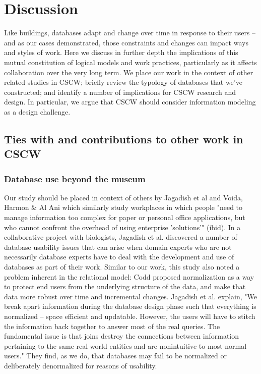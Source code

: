 \section{Discussion}

Like buildings, databases adapt and change over time in response to their users -- and as our cases demonstrated, those constraints and changes can impact ways and styles of work. Here we discuss in further depth the implications of this mutual constitution of logical models and work practices, particularly as it affects collaboration over the very long term. We place our work in the context of other related studies in CSCW; briefly review the typology of databases that we've constructed; and identify a number of implications for CSCW research and design. In particular, we argue that CSCW should consider information modeling as a design challenge.

\subsection {Ties with and contributions to other work in CSCW}
\subsubsection{Database use beyond the museum}

Our study should be placed in context of others by Jagadish et al \cite{jagadish2007making} and Voida, Harmon & Al Ani \cite{voida2011homebrew} which similarly study workplaces in which people "need to manage information too complex for paper or personal office applications, but who cannot confront the overhead of using enterprise 'solutions'" (ibid). In a collaborative project with biologists, Jagadish et al. discovered a number of database usability issues that can arise when domain experts who are not necessarily database experts have to deal with the development and use of databases as part of their work. Similar to our work, this study also noted a problem inherent in the relational model: Codd proposed normalization as a way to protect end users from the underlying structure of the data, and make that data more robust over time and incremental changes. Jagadish et al. explain, "We break apart information during the database design phase such that everything is normalized -- space efficient and updatable. However, the users will have to stitch the information back together to answer most of the real queries. The fundamental issue is that joins destroy the connections between information pertaining to the same real world entities and are nonintuitive to most normal users." \cite{jagadish2007making}  They find, as we do, that databases may fail to be normalized or deliberately denormalized for reasons of usability.

